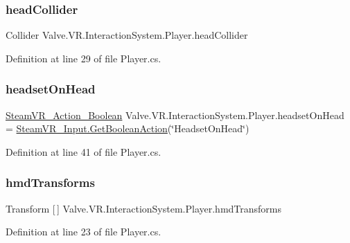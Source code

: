 \subsubsection{\texorpdfstring{headCollider}{headCollider}}
{\footnotesize\ttfamily Collider Valve.\+V\+R.\+Interaction\+System.\+Player.\+head\+Collider}



Definition at line 29 of file Player.\+cs.

\mbox{\label{class_valve_1_1_v_r_1_1_interaction_system_1_1_player_a22e6f26051cecb5311af29b25a55b54f}} 
\subsubsection{\texorpdfstring{headsetOnHead}{headsetOnHead}}
{\footnotesize\ttfamily \mbox{\hyperlink{class_valve_1_1_v_r_1_1_steam_v_r___action___boolean}{Steam\+V\+R\+\_\+\+Action\+\_\+\+Boolean}} Valve.\+V\+R.\+Interaction\+System.\+Player.\+headset\+On\+Head = \mbox{\hyperlink{class_valve_1_1_v_r_1_1_steam_v_r___input_a1442b5592282c75d7caeb91fe3509124}{Steam\+V\+R\+\_\+\+Input.\+Get\+Boolean\+Action}}(\char`\"{}Headset\+On\+Head\char`\"{})}



Definition at line 41 of file Player.\+cs.

\mbox{\label{class_valve_1_1_v_r_1_1_interaction_system_1_1_player_ac298669d1664666a895c1821f11ed616}} 
\subsubsection{\texorpdfstring{hmdTransforms}{hmdTransforms}}
{\footnotesize\ttfamily Transform \mbox{[}$\,$\mbox{]} Valve.\+V\+R.\+Interaction\+System.\+Player.\+hmd\+Transforms}



Definition at line 23 of file Player.\+cs.

